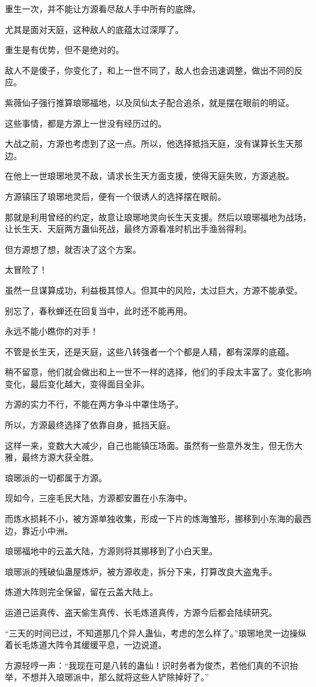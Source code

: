 \begin{this_body}
重生一次，并不能让方源看尽敌人手中所有的底牌。

尤其是面对天庭，这种敌人的底蕴太过深厚了。

重生是有优势，但不是绝对的。

敌人不是傻子，你变化了，和上一世不同了，敌人也会迅速调整，做出不同的反应。

紫薇仙子强行推算琅琊福地，以及凤仙太子配合追杀，就是摆在眼前的明证。

这些事情，都是方源上一世没有经历过的。

大战之前，方源也考虑到了这一点。所以，他选择抵挡天庭，没有谋算长生天那边。

在他上一世琅琊地灵不敌，请求长生天方面支援，使得天庭失败，方源逃脱。

方源镇压了琅琊地灵后，便有一个很诱人的选择摆在眼前。

那就是利用曾经的约定，故意让琅琊地灵向长生天支援。然后以琅琊福地为战场，让长生天、天庭两方蛊仙死战，最终方源看准时机出手渔翁得利。

但方源想了想，就否决了这个方案。

太冒险了！

虽然一旦谋算成功，利益极其惊人。但其中的风险，太过巨大，方源不能承受。

别忘了，春秋蝉还在回复当中，此时还不能再用。

永远不能小瞧你的对手！

不管是长生天，还是天庭，这些八转强者一个个都是人精，都有深厚的底蕴。

稍不留意，他们就会做出和上一世不一样的选择，他们的手段太丰富了。变化影响变化，最后变化越大，变得面目全非。

方源的实力不行，不能在两方争斗中罩住场子。

所以，方源最终选择了依靠自身，抵挡天庭。

这样一来，变数大大减少，自己也能镇压场面。虽然有一些意外发生，但无伤大雅，最终方源大获全胜。

琅琊派的一切都属于方源。

现如今，三座毛民大陆，方源都安置在小东海中。

而炼水损耗不小，被方源单独收集，形成一下片的炼海雏形，挪移到小东海的最西边，靠近小中洲。

琅琊福地中的云盖大陆，方源则将其挪移到了小白天里。

琅琊派的残破仙蛊屋炼炉，被方源收走，拆分下来，打算改良大盗鬼手。

炼道大阵则完全保留，留在云盖大陆上。

运道己运真传、盗天偷生真传、长毛炼道真传，方源今后都会陆续研究。

“三天的时间已过，不知道那几个异人蛊仙，考虑的怎么样了。”琅琊地灵一边操纵着长毛炼道大阵令其缓缓平息，一边说道。

方源轻哼一声：“我现在可是八转的蛊仙！识时务者为俊杰，若他们真的不识抬举，不想并入琅琊派中，那么就将这些人铲除掉好了。”

\end{this_body}

